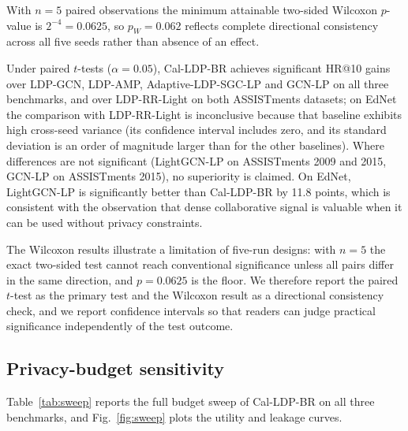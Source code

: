 \documentclass[pdflatex,sn-basic,Numbered]{sn-jnl}
\theoremstyle{plain}
\theoremstyle{remark}
\theoremstyle{definition}
\begin{document}
\begin{table}[t]
\vspace{2pt}
{\footnotesize With $n=5$ paired observations the minimum attainable two-sided Wilcoxon $p$-value is $2^{-4}=0.0625$, so $p_W=0.062$ reflects complete directional consistency across all five seeds rather than absence of an effect.}
\end{table}

Under paired $t$-tests ($\alpha=0.05$), Cal-LDP-BR achieves significant HR@10 gains over LDP-GCN, LDP-AMP, Adaptive-LDP-SGC-LP and GCN-LP on all three benchmarks, and over LDP-RR-Light on both ASSISTments datasets; on EdNet the comparison with LDP-RR-Light is inconclusive because that baseline exhibits high cross-seed variance (its confidence interval includes zero, and its standard deviation is an order of magnitude larger than for the other baselines). Where differences are not significant (LightGCN-LP on ASSISTments 2009 and 2015, GCN-LP on ASSISTments 2015), no superiority is claimed. On EdNet, LightGCN-LP is significantly better than Cal-LDP-BR by 11.8 points, which is consistent with the observation that dense collaborative signal is valuable when it can be used without privacy constraints.

The Wilcoxon results illustrate a limitation of five-run designs: with $n=5$ the exact two-sided test cannot reach conventional significance unless all pairs differ in the same direction, and $p=0.0625$ is the floor. We therefore report the paired $t$-test as the primary test and the Wilcoxon result as a directional consistency check, and we report confidence intervals so that readers can judge practical significance independently of the test outcome.

\subsection{Privacy-budget sensitivity}\label{sec:sweep}

Table~\ref{tab:sweep} reports the full budget sweep of Cal-LDP-BR on all three benchmarks, and Fig.~\ref{fig:sweep} plots the utility and leakage curves.
\end{document}
